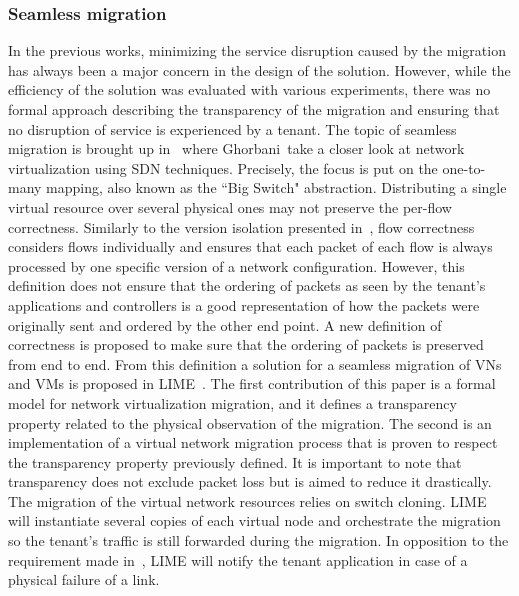 \subsubsection{Seamless migration}
In the previous works, minimizing the service disruption caused by the migration has always been a major concern in the design of the solution. However, while the efficiency of the solution was evaluated with various experiments, there was no formal approach describing the transparency of the migration and ensuring that no disruption of service is experienced by a tenant.
The topic of seamless migration is brought up in~\cite{toward-Ghorbani2014} where Ghorbani~\etal take a closer look at network virtualization using SDN techniques.
Precisely, the focus is put on the one-to-many mapping, also known as the ``Big Switch" abstraction.
Distributing a single virtual resource over several physical ones may not preserve the per-flow correctness.
Similarly to the version isolation presented in~\cite{Liu2015a}, flow correctness considers flows individually and ensures that each packet of each flow  is always processed by one specific version of a network configuration. 
However, this definition does not ensure that the ordering of packets as seen by the tenant's applications and controllers is a good representation of how the packets were originally sent and ordered by the other end point.
A new definition of correctness is proposed to make sure that the ordering of packets is preserved from end to end.
From this definition  a solution for a seamless migration of VNs and VMs is proposed in LIME~\cite{Lime-Ghorbani2014}.
The first contribution of this paper is a formal model for network virtualization migration, and it defines a transparency property related to the physical observation of the migration.
The second is an implementation of a virtual network migration process that is proven to respect the transparency property previously defined.
It is important to note that transparency does not exclude packet loss but is aimed to reduce it drastically.
The migration of the virtual network resources relies on switch cloning.
LIME will instantiate several copies of each virtual node and orchestrate the migration so the tenant's traffic is still forwarded during the migration.
In opposition to the requirement made in~\cite{Ko2017c}, LIME will notify the tenant application in case of a physical failure of a link.
